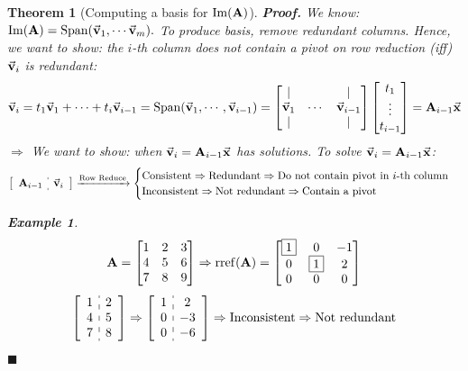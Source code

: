 \documentclass[12pt, a4paper]{article}
\newtheorem{thm}{Theorem}[subsection]
\newtheorem{eg}{Example}[subsection]
\newenvironment*{prf}{\par\indent\textbf{\textit{Proof. }}}{\hfill $\blacksquare$\par}
\def\IM{{\mathrm{Im}}}
\def\rref{\mathrm{rref}}
\def\Span{\mathrm{Span}}
\def\vecx{\va{x}}
\def\vecv{\va{v}}
\def\matrixA{\vb{A}}
\begin{document}
\begin{thm}[Computing a basis for $\IM(\matrixA)$]
	\begin{prf}
		We know: $\IM(\matrixA)=\Span(\vecv_1,\cdots\vecv_m).$ To produce basis, remove redundant columns. 
		Hence, we want to show: the $i$-th column does not contain a pivot on row reduction \emph(iff) $\vecv_i$ is redundant: 
		\[\vecv_i=t_1\vecv_1+\cdots+t_i\vecv_{i-1}=\Span(\vecv_1,\cdots,\vecv_{i-1})=\begin{bmatrix}|&&|\\\vecv_1&\cdots&\vecv_{i-1}\\|&&|\end{bmatrix}\begin{bmatrix}t_1\\\vdots\\t_{i-1}\end{bmatrix}=\matrixA_{i-1}\vecx\]
		$\Rightarrow$ We want to show: when $\vecv_i=\matrixA_{i-1}\vecx$ has solutions. To solve $\vecv_i=\matrixA_{i-1}\vecx$: 
		\[\left[\begin{array}{c:c}\matrixA_{i-1}&\vecv_i\end{array}\right]\xrightarrow[]{\text{Row Reduce}}\begin{cases}\text{Consistent}\Rightarrow\text{Redundant}\Rightarrow\text{Do not contain pivot in }i\text{-th column}\\\text{Inconsistent}\Rightarrow\text{Not redundant}\Rightarrow\text{Contain a pivot}\end{cases}\]
		\begin{eg}
			\[\matrixA=\begin{bmatrix}1&2&3\\4&5&6\\7&8&9\end{bmatrix}\Rightarrow\rref(\matrixA)=\begin{bmatrix}\boxed{1}&0&-1\\0&\boxed{1}&2\\0&0&0\end{bmatrix}\]
			\[\left[\begin{array}{c:c}\begin{matrix}1\\4\\7\end{matrix}&\begin{matrix}2\\5\\8\end{matrix}\end{array}\right]\Rightarrow\left[\begin{array}{c:c}\begin{matrix}1\\0\\0\end{matrix}&\begin{matrix}2\\-3\\-6\end{matrix}\end{array}\right]\Rightarrow\text{Inconsistent}\Rightarrow\text{Not redundant}\]

\end{eg}
\end{prf}
\end{thm}
\end{document}
